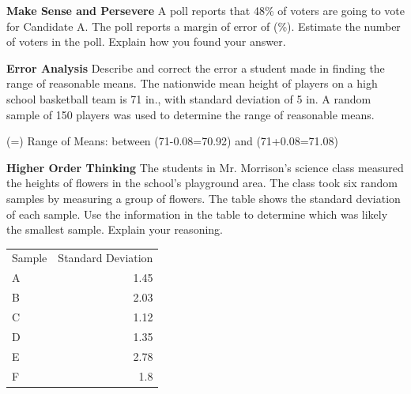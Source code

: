 \documentclass{article}
\newenvironment{practice}[2]{}{}        %
\newcommand{\answer}[1]{}               %
\newcommand{\te}[1]{}                   %
\begin{document}
\begin{practice}{11}{2}
\textbf{Make Sense and Persevere} A poll reports that 48\% of voters are going to vote for Candidate A. The poll reports a margin of error of (\%). Estimate the number of voters in the poll. Explain how you found your answer.
\answer{625; Substitute 0.04 for margin of error in the formula (\text{Margin of Error}=\frac{1}{\sqrt{n}}): (0.04=\frac{1}{\sqrt{n}}). Multiply both sides by (\sqrt{n}): (0.04\sqrt{n}=1). Divide both sides by 0.04: (\sqrt{n}=25). Square both sides: (n=625).}
\end{practice}
\begin{practice}{12}{2}
\textbf{Error Analysis} Describe and correct the error a student made in finding the range of reasonable means.
The nationwide mean height of players on a high school basketball team is 71 in., with standard deviation of 5 in. A random sample of 150 players was used to determine the range of reasonable means.
\te{Student work with red X:}
(=)
Range of Means:
between (71-0.08=70.92)
and (71+0.08=71.08)
\answer{The student should have used the formula (\text{Margin of Error}=\frac{2\sigma}{\sqrt{n}}) because the standard deviation is given. The range of reasonable means is between 70.2 and 71.8 inches.}
\end{practice}
\begin{practice}{13}{2}
\textbf{Higher Order Thinking} The students in Mr. Morrison's science class measured the heights of flowers in the school's playground area. The class took six random samples by measuring a group of flowers. The table shows the standard deviation of each sample. Use the information in the table to determine which was likely the smallest sample. Explain your reasoning.
\begin{tabular}{lr}
Sample & Standard Deviation \\
A & 1.45 \\
B & 2.03 \\
C & 1.12 \\
D & 1.35 \\
E & 2.78 \\
F & 1.8 \\
\end{tabular}
\answer{Sample E; A smaller sample size has more variability and a greater standard deviation.}
\te{Printed key treats a sample's standard deviation as the standard deviation of a sampling distribution; these are different quantities, and the individual sample sizes cannot be inferred this way.}
\end{practice}
\end{document}
